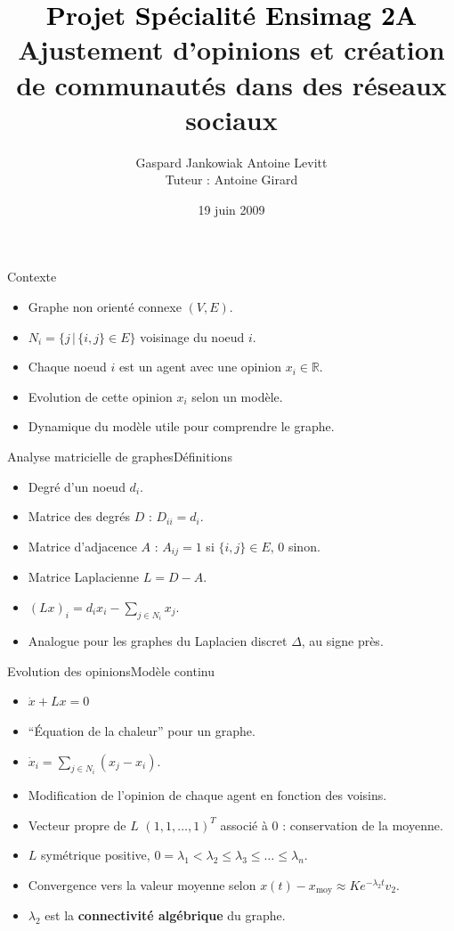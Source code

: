 \documentclass{beamer}
\author{Gaspard Jankowiak \quad Antoine Levitt\\ Tuteur : Antoine Girard}
\title{{\textbf{\textcolor{black}{Projet Spécialité Ensimag 2A}}}\vspace{1cm}\\ {Ajustement d'opinions et création de communautés dans des réseaux
sociaux}}
\date{19 juin 2009}
\begin{document}
\begin{frame}
	\maketitle
\end{frame}

\begin{frame}{Contexte}
  \begin{itemize}
  \item Graphe non orienté connexe $(V, E)$.
  \item $N_i = \{j\, |\, \{i, j\} \in E\}$ voisinage du noeud $i$.
  \item Chaque noeud $i$ est un agent avec une opinion $x_i \in
    \mathbb {R}$.
  \item Evolution de cette opinion $x_i$ selon un modèle.
  \item Dynamique du modèle utile pour comprendre le graphe.
  \end{itemize}
\end{frame}

\begin{frame}{Analyse matricielle de graphes}{Définitions}
  \begin{itemize}
  \item Degré d'un noeud $d_i$.
  \item Matrice des degrés $D$ : $D_{i i} = d_i$.
  \item Matrice d'adjacence $A$ : $A_{i j} = 1$ si $\{i,j\} \in E$,
    $0$ sinon.
  \item Matrice Laplacienne $L = D - A$.
  \item $(L x)_i = d_i x_i - \sum_{j \in N_i} x_j$.
  \item Analogue pour les graphes du Laplacien discret $\Delta$, au signe près.
  \end{itemize}
\end{frame}

\begin{frame}{Evolution des opinions}{Modèle continu}
  \begin{itemize}
  \item   $\dot{x} + L x = 0$
  \item ``Équation de la chaleur'' pour un graphe.
  \item $\dot{x}_i = \sum_{j \in N_i} (x_j - x_i)$.
  \item Modification de l'opinion de chaque agent en fonction des voisins.
  \item Vecteur propre de $L$ $(1, 1, \dots, 1)^T$ associé à $0$ :
    conservation de la moyenne.
  \item $L$ symétrique positive, $0 = \lambda_1 < \lambda_2 \leq
    \lambda_3 \leq \dots \leq \lambda_n$.
  \item Convergence vers la valeur moyenne selon $x(t) - x_\text{moy}
    \approx K e^{-\lambda_2 t} v_2$.
  \item $\lambda_2$ est la {\bf connectivité algébrique} du graphe.
  \end{itemize}
\end{frame}
\end{document}
